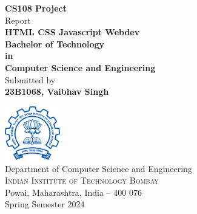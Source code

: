 \begin{titlepage}

\begin{center}

\textup{\small {\bf CS108 Project} \\ Report}\\[0.2in]

\Large \textbf {HTML CSS Javascript Webdev}\\[0.5in]

       {\bf Bachelor of Technology \\in\\ Computer Science and Engineering}\\[0.5in]

\normalsize Submitted by \\
\textbf{23B1068, Vaibhav Singh}



\vfill

\includegraphics[width=0.18\textwidth]{./iitb-logo}\\[0.1in]
\Large{Department of Computer Science and Engineering}\\
\normalsize
\textsc{Indian Institute of Technology Bombay}\\
Powai, Maharashtra, India -- 400 076 \\
\vspace{0.2cm}
Spring Semester 2024

\end{center}

\end{titlepage}
